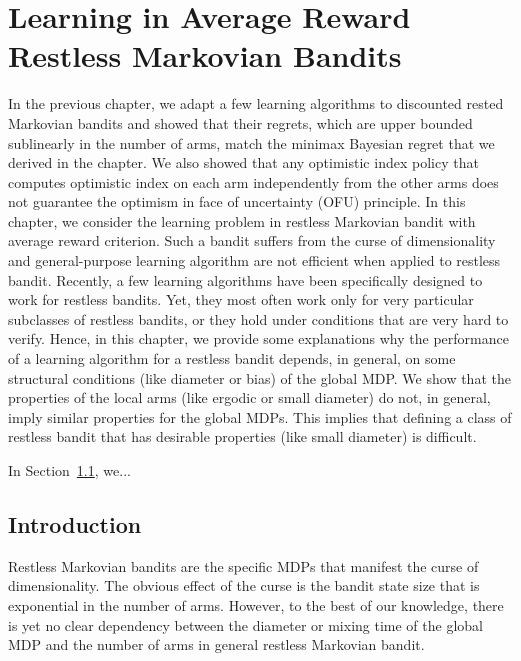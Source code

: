 \begingroup
\let\clearpage\relax

\chapter{Learning in Average Reward Restless Markovian Bandits}
\label{ch:learning_restless}

In the previous chapter, we adapt a few learning algorithms to discounted rested Markovian bandits and showed that their regrets, which are upper bounded sublinearly in the number of arms, match the minimax Bayesian regret that we derived in the chapter.
We also showed that any optimistic index policy that computes optimistic index on each arm independently from the other arms does not guarantee the optimism in face of uncertainty (OFU) principle.
In this chapter, we consider the learning problem in restless Markovian bandit with average reward criterion.
Such a bandit suffers from the curse of dimensionality and general-purpose learning algorithm are not efficient when applied to restless bandit. Recently, a few learning algorithms have been specifically designed to work for restless bandits. Yet, they most often work only for very particular subclasses of restless bandits, or they hold under conditions that are very hard to verify.
Hence, in this chapter, we provide some explanations why the performance of a learning algorithm for a restless bandit depends, in general, on some structural conditions (like diameter or bias) of the global MDP. We show that the properties of the local arms (like ergodic or small diameter) do not, in general, imply similar properties for the global MDPs. This implies that defining a class of restless bandit that has desirable properties (like small diameter) is difficult. 

In Section~\ref{}, we...

\section{Introduction}

Restless Markovian bandits are the specific MDPs that manifest the curse of dimensionality.
The obvious effect of the curse is the bandit state size that is exponential in the number of arms.
However, to the best of our knowledge, there is yet no clear dependency between the diameter or mixing time of the global MDP and the number of arms in general restless Markovian bandit.

